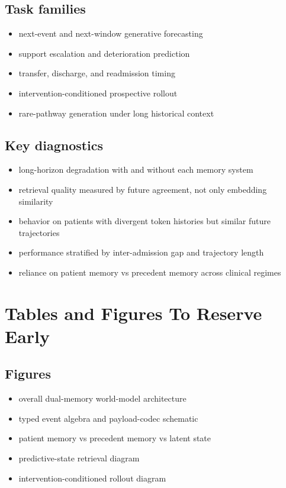 \documentclass[11pt]{article}
\begin{document}
\subsection{Task families}

\begin{itemize}
    \item next-event and next-window generative forecasting
    \item support escalation and deterioration prediction
    \item transfer, discharge, and readmission timing
    \item intervention-conditioned prospective rollout
    \item rare-pathway generation under long historical context
\end{itemize}

\subsection{Key diagnostics}

\begin{itemize}
    \item long-horizon degradation with and without each memory system
    \item retrieval quality measured by future agreement, not only embedding similarity
    \item behavior on patients with divergent token histories but similar future trajectories
    \item performance stratified by inter-admission gap and trajectory length
    \item reliance on patient memory vs precedent memory across clinical regimes
\end{itemize}

\section{Tables and Figures To Reserve Early}

\subsection{Figures}

\begin{itemize}
    \item overall dual-memory world-model architecture
    \item typed event algebra and payload-codec schematic
    \item patient memory vs precedent memory vs latent state
    \item predictive-state retrieval diagram
    \item intervention-conditioned rollout diagram
\end{itemize}
\end{document}
